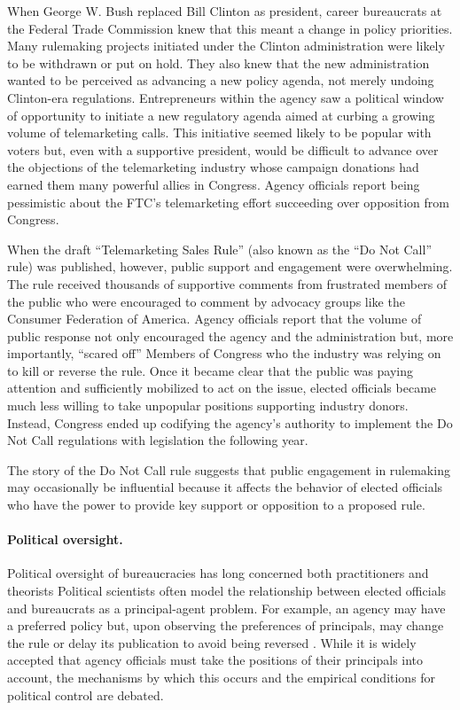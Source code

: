 When George W. Bush replaced Bill Clinton as president, career bureaucrats at the Federal Trade Commission knew that this meant a change in policy priorities. Many rulemaking projects initiated under the Clinton administration were likely to be withdrawn or put on hold. They also knew that the new administration wanted to be perceived as advancing a new policy agenda, not merely undoing Clinton-era regulations. Entrepreneurs within the agency saw a political window of opportunity to initiate a new regulatory agenda aimed at curbing a growing volume of telemarketing calls. This initiative seemed likely to be popular with voters but, even with a supportive president, would be difficult to advance over the objections of the telemarketing industry whose campaign donations had earned them many powerful allies in Congress. Agency officials report being pessimistic about the FTC's telemarketing effort succeeding over opposition from Congress.

When the draft ``Telemarketing Sales Rule'' (also known as the ``Do Not Call'' rule) was published, however, public support and engagement were overwhelming. The rule received thousands of supportive comments from frustrated members of the public who were encouraged to comment by advocacy groups like the Consumer Federation of America. Agency officials report that the volume of public response not only encouraged the agency and the administration but, more importantly, ``scared off'' Members of Congress who the industry was relying on to kill or reverse the rule. Once it became clear that the public was paying attention and sufficiently mobilized to act on the issue, elected officials became much less willing to take unpopular positions supporting industry donors. Instead, Congress ended up codifying the agency's authority to implement the Do Not Call regulations with legislation the following year.

The story of the Do Not Call rule suggests that public engagement in rulemaking may occasionally be influential because it affects the behavior of elected officials who have the power to provide key support or opposition to a proposed rule.


\paragraph{Political oversight.}
Political oversight of bureaucracies has long concerned both practitioners and theorists %
Political scientists often model the relationship between elected officials and bureaucrats as a principal-agent problem. For example, an agency may have a preferred policy but, upon observing the preferences of principals, may change the rule or delay its publication to avoid being reversed \citep{Potter2016}. While it is widely accepted that agency officials must take the positions of their principals into account, the mechanisms by which this occurs and the empirical conditions for political control are debated.

